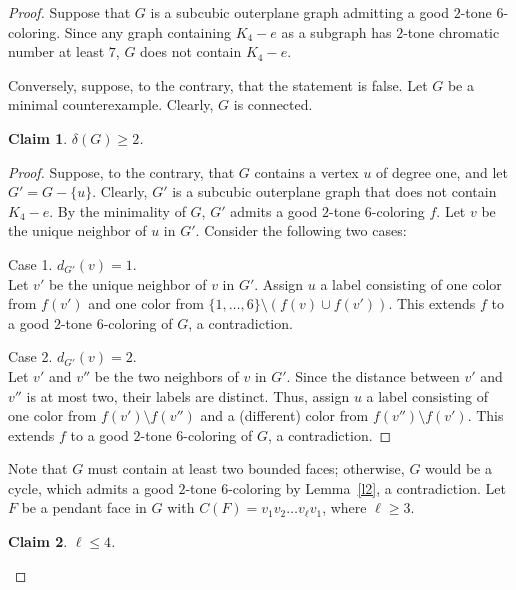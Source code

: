 \documentclass[12pt]{article}
\numberwithin{theorem}{section}
\numberwithin{conjecture}{section}
\numberwithin{corollary}{section}
\numberwithin{example}{section}
\numberwithin{lemma}{section}
\numberwithin{proposition}{section}
\numberwithin{problem}{section}
\numberwithin{remark}{section}
\newtheorem{claim}{Claim}
\numberwithin{claim}{theorem}
\numberwithin{definition}{section}
\begin{document}
\begin{proof} 
Suppose that $G$ is a subcubic outerplane graph admitting a good $2$-tone $6$-coloring. Since any graph containing $K_4-e$ as a subgraph has $2$-tone chromatic number at least $7$, $G$ does not contain $K_4-e$.

\noindent Conversely, suppose, to the contrary, that the statement is false. Let $G$ be a minimal counterexample. Clearly, $G$ is connected.

\begin{claim}
    $\delta(G)\geq 2$.
\end{claim} 
\begin{proof}
\noindent Suppose, to the contrary, that $G$ contains a vertex $u$ of degree one, and let $G' = G-\{u\}$. Clearly, $G'$ is a subcubic outerplane graph that does not contain $K_4-e$. By the minimality of $G$, $G'$ admits a good $2$-tone $6$-coloring $f$. Let $v$ be the unique neighbor of $u$ in $G'$. Consider the following two cases:

\noindent Case 1. $d_{G'}(v) = 1$.\\
\noindent Let $v'$ be the unique neighbor of $v$ in $G'$. Assign $u$ a label consisting of one color from $f(v')$ and one color from $\{1,\dots,6\}\setminus (f(v)\cup f(v'))$. This extends $f$ to a good $2$-tone $6$-coloring of $G$, a contradiction.

\noindent Case 2. $d_{G'}(v) = 2$.\\
\noindent Let $v'$ and $v''$ be the two neighbors of $v$ in $G'$. Since the distance between $v'$ and $v''$ is at most two, their labels are distinct. Thus, assign $u$ a label consisting of one color from $f(v')\setminus f(v'')$ and a (different) color from $f(v'')\setminus f(v')$. This extends $f$ to a good $2$-tone $6$-coloring of $G$, a contradiction.\end{proof}

\noindent Note that $G$ must contain at least two bounded faces; otherwise, $G$ would be a cycle, which admits a good $2$-tone $6$-coloring by Lemma~\ref{l2}, a contradiction. Let $F$ be a pendant face in $G$ with $C(F) = v_1v_2 \dots v_\ell v_1$, where $\ell \ge 3$.

\begin{claim}
   $\ell \leq 4$.
\end{claim}


\end{proof}
\end{document}
